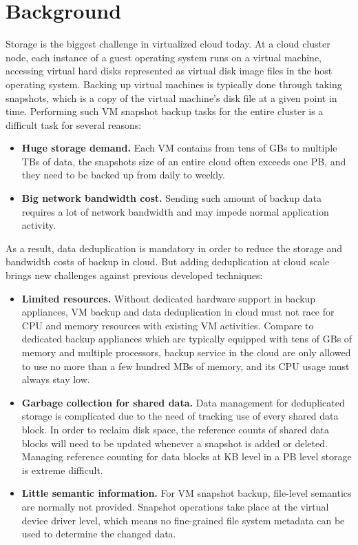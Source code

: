 \chapter{Background}
\label{chap:back}
Storage is the biggest challenge in virtualized cloud today.
At a cloud cluster node, each instance of a guest operating 
system runs on a virtual machine, accessing virtual hard disks 
represented as virtual disk image files in the host operating system.
Backing up virtual machines is typically done through taking snapshots,
which is a copy of the virtual machine's disk file at a given point in time.
Performing such VM snapshot backup tasks for the entire cluster is a difficult task
for several reasons: 
\begin{itemize}
\item \textbf{Huge storage demand.} Each VM contains from tens of GBs to multiple TBs of data,
the snapshots size of an entire cloud often exceeds one PB, and they need to be backed up from daily to weekly.
\item \textbf{Big network bandwidth cost.} Sending such amount of backup data requires
a lot of network bandwidth and may impede normal application activity.
\end{itemize}

As a result, data deduplication is mandatory in order to reduce the storage and bandwidth
costs of backup in cloud. But adding deduplication at cloud scale brings new
challenges against previous developed techniques:
\begin{itemize}
\item \textbf{Limited resources.} Without dedicated hardware support in backup appliances, 
VM backup and data deduplication in cloud must not race for CPU and memory resources with
existing VM activities. Compare to dedicated backup appliances which are typically equipped with
tens of GBs of memory and  multiple processors, backup service in the cloud are only allowed to use
no more than a few hundred MBs of memory, and its CPU usage must always stay low.
\item \textbf{Garbage collection for shared data.} Data management for deduplicated storage
is complicated due to the need of tracking use of every shared data block. In order to reclaim
disk space, the reference counts of
shared data blocks will need to be updated whenever a snapshot is added or deleted.
Managing reference counting for data blocks at KB level in a PB level storage is extreme difficult.
\item \textbf{Little semantic information.} For VM snapshot backup, file-level semantics are normally not provided.
Snapshot operations take place at the virtual device driver level, which
means no fine-grained file system metadata can be used to determine the changed data. 
\end{itemize}

